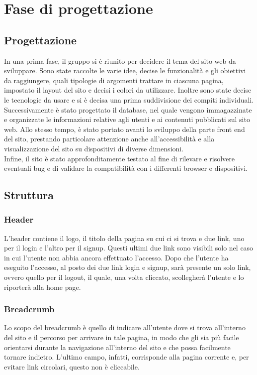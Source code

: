 \section{Fase di progettazione}
\subsection{Progettazione}
In una prima fase, il gruppo si è riunito per decidere il tema del sito web da sviluppare. Sono state raccolte le varie idee, decise le funzionalità e gli obiettivi da raggiungere, quali tipologie di argomenti trattare in ciascuna pagina, impostato il layout del sito e decisi i colori da utilizzare. Inoltre sono state decise le tecnologie da usare e si è decisa una prima suddivisione dei compiti individuali. \\
Successivamente è stato progettato il database, nel quale vengono immagazzinate e organizzate le informazioni relative agli utenti e ai contenuti pubblicati sul sito web. Allo stesso tempo, è stato portato avanti lo sviluppo della parte front end del sito, prestando particolare attenzione anche all'accessibilità e alla visualizzazione del sito su dispositivi di diverse dimensioni. \\
Infine, il sito è stato approfonditamente testato al fine di rilevare e risolvere eventuali bug e di validare la compatibilità con i differenti browser e dispositivi.
\subsection{Struttura}
\subsubsection{Header}
L'header contiene il logo, il titolo della pagina su cui ci si trova e due link, uno per il login e l'altro per il signup. Questi ultimi due link sono visibili solo nel caso in cui l'utente non abbia ancora effettuato l'accesso. Dopo che l'utente ha eseguito l'accesso, al posto dei due link login e signup, sarà presente un solo link, ovvero quello per il logout, il quale, una volta cliccato, scollegherà l'utente e lo riporterà alla home page. 
\subsubsection{Breadcrumb}
Lo scopo del breadcrumb è quello di indicare all'utente dove si trova all'interno del sito e il percorso per arrivare in tale pagina, in modo che gli sia più facile orientarsi durante la navigazione all'interno del sito e che possa facilmente tornare indietro. L'ultimo campo, infatti, corrisponde alla pagina corrente e, per evitare link circolari, questo non è cliccabile.
